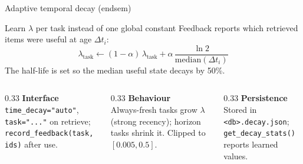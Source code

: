 \documentclass[aspectratio=169,10pt]{beamer}
\begin{document}
\begin{frame}{Adaptive temporal decay (endsem)}
  \begin{block}{Learn $\lambda$ per task instead of one global constant}
    Feedback reports which retrieved items were useful at age $\Delta t_i$:
    \[
      \lambda_{\text{task}} \leftarrow (1-\alpha)\,\lambda_{\text{task}} + \alpha\,\frac{\ln 2}{\mathrm{median}(\Delta t_i)}
    \]
    The half-life is set so the median useful state decays by 50\%.
  \end{block}
  \begin{columns}[T,onlytextwidth]
    \begin{column}{0.33\textwidth}
      \textbf{Interface}\\[1pt]
      {\footnotesize \texttt{time\_decay="auto"}, \texttt{task="..."} on retrieve; \texttt{record\_feedback(task, ids)} after use.}
    \end{column}
    \begin{column}{0.33\textwidth}
      \textbf{Behaviour}\\[1pt]
      {\footnotesize Always-fresh tasks grow $\lambda$ (strong recency); horizon tasks shrink it. Clipped to $[0.005, 0.5]$.}
    \end{column}
    \begin{column}{0.33\textwidth}
      \textbf{Persistence}\\[1pt]
      {\footnotesize Stored in \texttt{<db>.decay.json}; \texttt{get\_decay\_stats()} reports learned values.}
    \end{column}
  \end{columns}
\end{frame}
\end{document}
